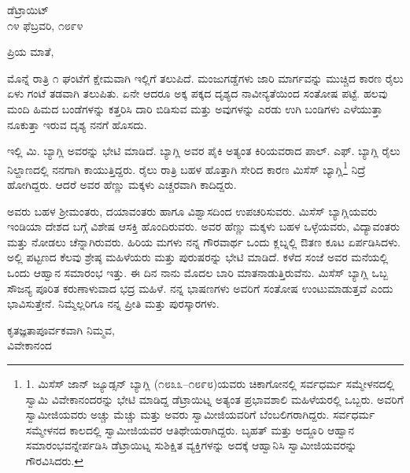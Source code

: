 \begin{flushright}
ಡೆಟ್ರಾಯಿಟ್\\೧೪ ಫೆಬ್ರವರಿ, ೧೮೯೪
\end{flushright}

ಪ್ರಿಯ ಮಾತೆ,

ಮೊನ್ನೆ ರಾತ್ರಿ ೧ ಘಂಟೆಗೆ ಕ್ಷೇಮವಾಗಿ ಇಲ್ಲಿಗೆ ತಲುಪಿದೆ. ಮಂಜುಗಡ್ಡೆಗಳು ಜಾರಿ ಮಾರ್ಗವನ್ನು ಮುಚ್ಚಿದ ಕಾರಣ ರೈಲು ಏಳು ಗಂಟೆ ತಡವಾಗಿ ತಲುಪಿತು. ಏನೇ ಆದರೂ ಅಕ್ಕ ಪಕ್ಕದ ದೃಶ್ಯದ ನಾವೀನ್ಯತೆಯಿಂದ ಸಂತೋಷ ಪಟ್ಟೆ. ಹಲವು ಮಂದಿ ಹಿಮದ ಬಂಡೆಗಳನ್ನು ಕತ್ತರಿಸಿ ದಾರಿ ಬಿಡಿಸುವ ಮತ್ತು ಅವುಗಳನ್ನು ಎರಡು ಉಗಿ ಬಂಡಿಗಳು ಎಳೆಯುತ್ತಾ ನೂಕುತ್ತಾ ಇರುವ ದೃಶ್ಯ ನನಗೆ ಹೊಸದು.

ಇಲ್ಲಿ ಮಿ. ಬ್ಯಾಗ್ಲಿ ಅವರನ್ನು ಭೇಟಿ ಮಾಡಿದೆ. ಬ್ಯಾಗ್ಲಿ ಅವರ ಪೈಕಿ ಅತ್ಯಂತ ಕಿರಿಯವರಾದ ಪಾಲ್. ಎಫ್. ಬ್ಯಾಗ್ಲಿ ರೈಲು ನಿಲ್ದಾಣದಲ್ಲಿ ನನಗಾಗಿ ಕಾಯುತ್ತಿದ್ದರು. ರೈಲು ರಾತ್ರಿ ಬಹಳ ಹೊತ್ತಾಗಿ ಸೇರಿದ ಕಾರಣ ಮಿಸೆಸ್ ಬ್ಯಾಗ್ಲಿ\footnote{1. ಮಿಸೆಸ್ ಜಾನ್ ಜ್ಯೂಡ್ಸನ್ ಬ್ಯಾಗ್ಲಿ (೧೮೩೩–೧೮೯೮)ಯವರು ಚಿಕಾಗೋನಲ್ಲಿ ಸರ್ವಧರ್ಮ ಸಮ್ಮೇಳನದಲ್ಲಿ ಸ್ವಾಮಿ ವಿವೇಕಾನಂದರನ್ನು ಭೇಟಿ ಮಾಡಿದ್ದ ಡೆಟ್ರಾಯಿಟ್ನ ಅತ್ಯಂತ ಪ್ರಭಾವಶಾಲಿ ಮಹಿಳೆಯರಲ್ಲಿ ಒಬ್ಬರು. ಅವರಿಗೆ ಸ್ವಾಮೀಜಿಯವರು ಅಚ್ಚು ಮೆಚ್ಚು ಮತ್ತು ಅವರು ಸ್ವಾಮೀಜಿಯವರಿಗೆ ಬೆಂಬಲಿಗರಾಗಿದ್ದರು. ಸರ್ವಧರ್ಮ ಸಮ್ಮೇಳನದ ಕಾಲದಲ್ಲಿ ಸ್ವಾಮೀಜಿಯವರ ಆತಿಥೇಯರಾಗಿದ್ದರು. ಬೃಹತ್ ಮತ್ತು ಅದ್ದೂರಿ ಆಹ್ವಾನ ಸಮಾರಂಭವನ್ನೇರ್ಪಡಿಸಿ ಡೆಟ್ರಾಯಿಟ್ನ ಸುಶಿಕ್ಷಿತ ವ್ಯಕ್ತಿಗಳನ್ನು ಅದಕ್ಕೆ ಆಹ್ವಾನಿಸಿ ಸ್ವಾಮೀಜಿಯವರನ್ನು ಗೌರವಿಸಿದರು.} ನಿದ್ರೆ ಹೋಗಿದ್ದರು. ಆದರೆ ಅವರ ಹೆಣ್ಣು ಮಕ್ಕಳು ಎಚ್ಚರವಾಗಿ ಕಾದಿದ್ದರು.

ಅವರು ಬಹಳ ಶ‍್ರೀಮಂತರು, ದಯಾವಂತರು ಹಾಗೂ ವಿಶ್ವಾಸದಿಂದ ಉಪಚರಿಸುವರು. ಮಿಸೆಸ್ ಬ್ಯಾಗ್ಲಿಯವರು ಇಂಡಿಯಾ ದೇಶದ ಬಗ್ಗೆ ವಿಶೇಷ ಆಸಕ್ತಿ ಹೊಂದಿರುವರು. ಅವರ ಹೆಣ್ಣು ಮಕ್ಕಳು ಬಹಳ ಒಳ್ಳೆಯವರು, ವಿದ್ಯಾವಂತರು ಮತ್ತು ನೋಡಲು ಚೆನ್ನಾಗಿರುವರು. ಹಿರಿಯ ಮಗಳು ನನ್ನ ಗೌರವಾರ್ಥ ಒಂದು ಕ್ಲಬ್ನಲ್ಲಿ ಔತಣ ಕೂಟ ಏರ್ಪಡಿಸಿದಳು. ಅಲ್ಲಿ ಪಟ್ಟಣದ ಕೆಲವು ಶ್ರೇಷ್ಠ ಮಹಿಳೆಯರು ಮತ್ತು ಪುರುಷರನ್ನು ಭೇಟಿ ಮಾಡಿದೆ. ಕಳೆದ ಸಂಜೆ ಅವರ ಮನೆಯಲ್ಲಿ ಒಂದು ಆಹ್ವಾನ ಸಮಾರಂಭ ಇತ್ತು. ಈ ದಿನ ನಾನು ಮೊದಲ ಬಾರಿ ಮಾತನಾಡುತ್ತಿರುವೆನು. ಮಿಸೆಸ್ ಬ್ಯಾಗ್ಲಿ ಒಬ್ಬ ಸೌಜನ್ಯ ಪೂರಿತ ಕರುಣಾಳುವಾದ ಭದ್ರ ಮಹಿಳೆ. ನನ್ನ ಭಾಷಣಗಳು ಅವರಿಗೆ ಸಂತೋಷ ಉಂಟುಮಾಡುತ್ತವೆ ಎಂದು ಭಾವಿಸುತ್ತೇನೆ. ನಿಮ್ಮೆಲ್ಲರಿಗೂ ನನ್ನ ಪ್ರೀತಿ ಮತ್ತು ಪುರಸ್ಕಾರಗಳು.

\begin{flushright}
ಕೃತಜ್ಞತಾಪೂರ್ವಕವಾಗಿ ನಿಮ್ಮವ,\\ವಿವೇಕಾನಂದ
\end{flushright}

